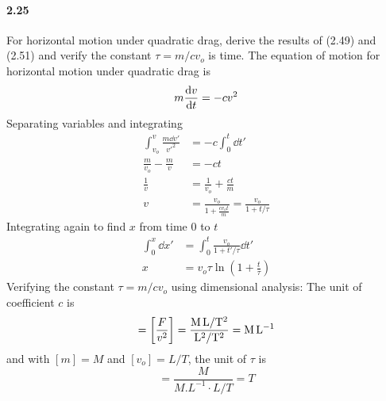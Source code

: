 \documentclass[../problems.tex]{subfiles}
\begin{document}
\paragraph{2.25} For horizontal motion under quadratic drag, derive the results of (2.49) and (2.51)
and verify the constant $\tau=m/cv_o$ is time.
\barh 
The equation of motion for horizontal motion under quadratic drag is
\begin{equation*}
    m \dv{v}{t} = -c v^2
\end{equation*}
Separating variables and integrating
\begin{align*}
    \int_{v_o}^v \frac{m \dd{v'}}{v'^2} &= -c \int_0^t \dd{t'} \\
    \frac{m}{v_o} - \frac{m}{v} &= -ct \\
    \frac{1}{v} &= \frac{1}{v_o} + \frac{ct}{m} \\
    v &= \frac{v_o}{1 + \frac{cv_ot}{m}} = \frac{v_o}{1 + t/\tau}
\end{align*}
Integrating again to find $x$ from time 0 to $t$
\begin{align*}
    \int_0^x \dd{x'} &= \int_0^t \frac{v_o}{1 + t'/\tau} \dd{t'} \\
    x &= v_o \tau \ln (1 + \frac{t}{\tau}) 
\end{align*}
Verifying the constant $\tau = m/cv_o$ using dimensional analysis: The unit of coefficient $c$
is
\begin{equation*}
    [c] = \quantity[\frac{F}{v^2}] = \frac{\si{M.L\per T^2}}{\si{L^2/T^2}} = \si{M.L^{-1}}  
\end{equation*}
and with $[m] = \si{M}$ and $[v_o] = \si{L/T}$, the unit of $\tau$ is
\begin{equation*}
    [\tau] = \frac{\si{M}}{\si{M.L^{-1}} \cdot \si{L/T}} = \si{T}
\end{equation*}
\end{document}
